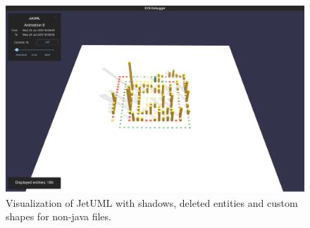 \begin{figure}
    \center
    \includegraphics[width=\textwidth]{SYNUI-deletedshadow.png}
    \caption{Visualization of JetUML with shadows, deleted entities and custom shapes for non-java files.}
    \label{fig:deletedshadow}
\end{figure}